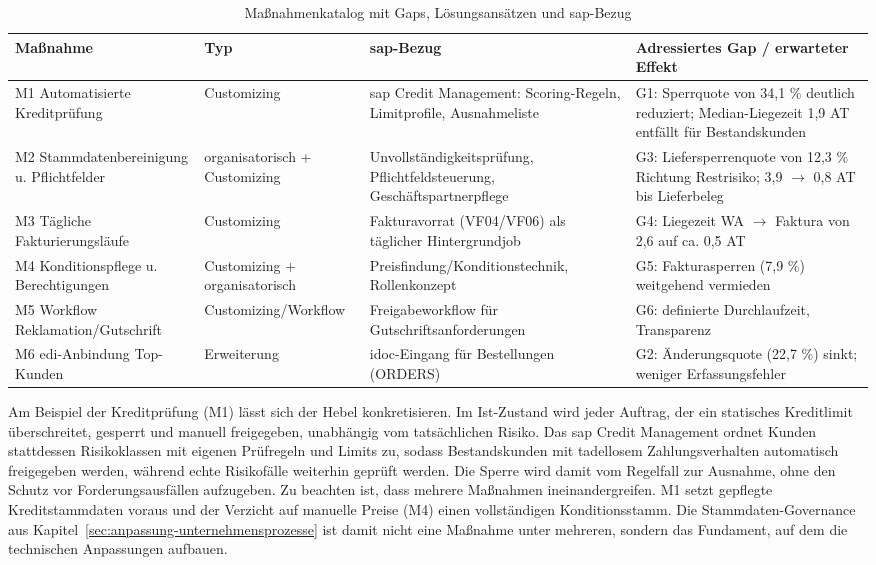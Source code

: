 \begin{table}[!htb]
\centering
\caption{Maßnahmenkatalog mit Gaps, Lösungsansätzen und \gls{sap}-Bezug}\label{tab:massnahmenkatalog}
\small
\begin{tabularx}{\textwidth}{@{}>{\RaggedRight\arraybackslash}p{3.0cm} >{\RaggedRight\arraybackslash}p{2.8cm} >{\RaggedRight\arraybackslash}p{4.4cm} >{\RaggedRight\arraybackslash}p{3.9cm}@{}}
\toprule
\textbf{Maßnahme} & \textbf{Typ} & \textbf{\gls{sap}-Bezug} & \textbf{Adressiertes Gap /\allowbreak{} erwarteter Effekt} \\
\midrule
M1 Automatisierte Kreditprüfung & Customizing & \gls{sap} Credit Management: Scoring-Regeln, Limitprofile, Ausnahmeliste & G1: Sperrquote von 34,1 \% deutlich reduziert; Median-Liegezeit 1,9 AT entfällt für Bestandskunden \\
M2 Stammdatenbereinigung u. Pflichtfelder & organisatorisch + Customizing & Unvollständigkeitsprüfung, Pflichtfeldsteuerung, Geschäftspartnerpflege & G3: Liefersperrenquote von 12,3 \% Richtung Restrisiko; 3,9 $\rightarrow$ 0,8 AT bis Lieferbeleg \\
M3 Tägliche Fakturierungsläufe & Customizing & Fakturavorrat (VF04/\allowbreak{}VF06) als täglicher Hintergrundjob & G4: Liegezeit WA $\rightarrow$ Faktura von 2,6 auf ca. 0,5 AT \\
M4 Konditionspflege u. Berechtigungen & Customizing + organisatorisch & Preisfindung/\allowbreak{}Konditionstechnik, Rollenkonzept & G5: Fakturasperren (7,9 \%) weitgehend vermieden \\
M5 Workflow Reklamation/\allowbreak{}Gutschrift & Customizing/\allowbreak{}Workflow & Freigabeworkflow für Gutschriftsanforderungen & G6: definierte Durchlaufzeit, Transparenz \\
M6 \gls{edi}-Anbindung Top-Kunden & Erweiterung & \gls{idoc}-Eingang für Bestellungen (ORDERS) & G2: Änderungsquote (22,7 \%) sinkt; weniger Erfassungsfehler \\
\bottomrule
\end{tabularx}
\end{table}

Am Beispiel der Kreditprüfung (M1) lässt sich der Hebel konkretisieren. Im Ist-Zustand wird jeder Auftrag, der ein statisches Kreditlimit überschreitet, gesperrt und manuell freigegeben, unabhängig vom tatsächlichen Risiko. Das \gls{sap} Credit Management ordnet Kunden stattdessen Risikoklassen mit eigenen Prüfregeln und Limits zu, sodass Bestandskunden mit tadellosem Zahlungsverhalten automatisch freigegeben werden, während echte Risikofälle weiterhin geprüft werden. Die Sperre wird damit vom Regelfall zur Ausnahme, ohne den Schutz vor Forderungsausfällen aufzugeben. Zu beachten ist, dass mehrere Maßnahmen ineinandergreifen. M1 setzt gepflegte Kreditstammdaten voraus und der Verzicht auf manuelle Preise (M4) einen vollständigen Konditionsstamm. Die Stammdaten-Governance aus Kapitel~\ref{sec:anpassung-unternehmensprozesse} ist damit nicht eine Maßnahme unter mehreren, sondern das Fundament, auf dem die technischen Anpassungen aufbauen.

